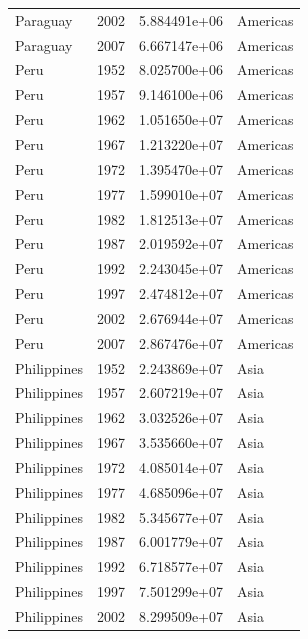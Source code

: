 \documentclass[
  letterpaper,
  DIV=11,
  numbers=noendperiod]{scrreprt}
\begin{document}
\begin{tcolorbox}
\begin{tabular}{lrrl}
Paraguay                 &  2002 &  5.884491e+06 &  Americas \\
Paraguay                 &  2007 &  6.667147e+06 &  Americas \\
Peru                     &  1952 &  8.025700e+06 &  Americas \\
Peru                     &  1957 &  9.146100e+06 &  Americas \\
Peru                     &  1962 &  1.051650e+07 &  Americas \\
Peru                     &  1967 &  1.213220e+07 &  Americas \\
Peru                     &  1972 &  1.395470e+07 &  Americas \\
Peru                     &  1977 &  1.599010e+07 &  Americas \\
Peru                     &  1982 &  1.812513e+07 &  Americas \\
Peru                     &  1987 &  2.019592e+07 &  Americas \\
Peru                     &  1992 &  2.243045e+07 &  Americas \\
Peru                     &  1997 &  2.474812e+07 &  Americas \\
Peru                     &  2002 &  2.676944e+07 &  Americas \\
Peru                     &  2007 &  2.867476e+07 &  Americas \\
Philippines              &  1952 &  2.243869e+07 &      Asia \\
Philippines              &  1957 &  2.607219e+07 &      Asia \\
Philippines              &  1962 &  3.032526e+07 &      Asia \\
Philippines              &  1967 &  3.535660e+07 &      Asia \\
Philippines              &  1972 &  4.085014e+07 &      Asia \\
Philippines              &  1977 &  4.685096e+07 &      Asia \\
Philippines              &  1982 &  5.345677e+07 &      Asia \\
Philippines              &  1987 &  6.001779e+07 &      Asia \\
Philippines              &  1992 &  6.718577e+07 &      Asia \\
Philippines              &  1997 &  7.501299e+07 &      Asia \\
Philippines              &  2002 &  8.299509e+07 &      Asia \\

\end{tabular}
\end{tcolorbox}
\end{document}
